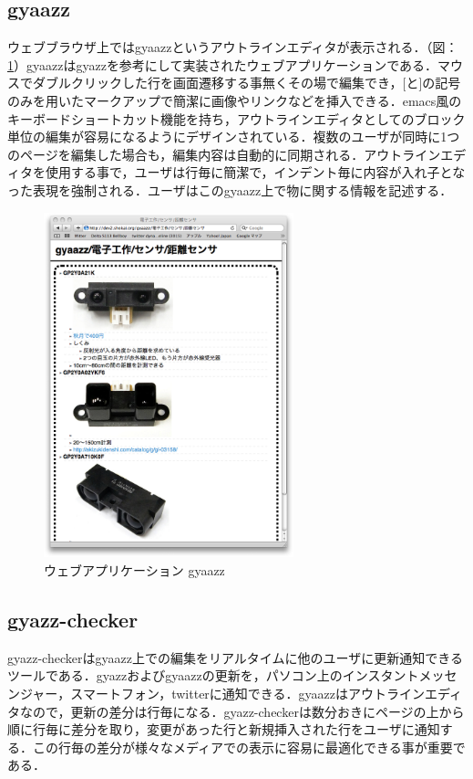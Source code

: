 \subsection{gyaazz}

ウェブブラウザ上ではgyaazzというアウトラインエディタが表示される．（図：\ref{fig:gyaazz}）gyaazzはgyazz\cite{gyazz}を参考にして実装されたウェブアプリケーションである．マウスでダブルクリックした行を画面遷移する事無くその場で編集でき，[と]の記号のみを用いたマークアップで簡潔に画像やリンクなどを挿入できる．emacs風のキーボードショートカット機能を持ち，アウトラインエディタとしてのブロック単位の編集が容易になるようにデザインされている．複数のユーザが同時に1つのページを編集した場合も，編集内容は自動的に同期される．アウトラインエディタを使用する事で，ユーザは行毎に簡潔で，インデント毎に内容が入れ子となった表現を強制される．ユーザはこのgyaazz上で物に関する情報を記述する．

\begin{figure}
  \begin{center}
    \includegraphics[height=100mm]{img/gyaazz.png}
  \end{center}
  \caption{ウェブアプリケーション gyaazz}
  \label{fig:gyaazz}
\end{figure}

\subsection{gyazz-checker}

gyazz-checkerはgyaazz上での編集をリアルタイムに他のユーザに更新通知できるツールである．gyazzおよびgyaazzの更新を，パソコン上のインスタントメッセンジャー，スマートフォン，twitterに通知できる．gyaazzはアウトラインエディタなので，更新の差分は行毎になる．gyazz-checkerは数分おきにページの上から順に行毎に差分を取り，変更があった行と新規挿入された行をユーザに通知する．この行毎の差分が様々なメディアでの表示に容易に最適化できる事が重要である．

